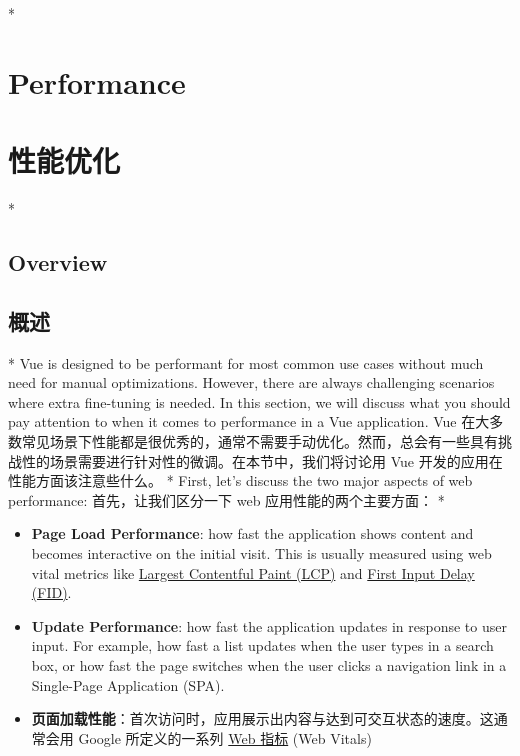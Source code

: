 \begin{paracol}{2} 
\switchcolumn[0]*%
\section{Performance}
\switchcolumn
\section{性能优化}
\switchcolumn[0]*%
\subsection{Overview}
\switchcolumn
\subsection{概述}
\switchcolumn[0]*%
Vue is designed to be performant for most common use cases without much
need for manual optimizations. However, there are always challenging
scenarios where extra fine-tuning is needed. In this section, we will
discuss what you should pay attention to when it comes to performance in
a Vue application.
\switchcolumn
Vue
在大多数常见场景下性能都是很优秀的，通常不需要手动优化。然而，总会有一些具有挑战性的场景需要进行针对性的微调。在本节中，我们将讨论用
Vue 开发的应用在性能方面该注意些什么。
\switchcolumn[0]*%
First, let's discuss the two major aspects of web performance:
\switchcolumn
首先，让我们区分一下 web 应用性能的两个主要方面： 
\switchcolumn[0]*%
\begin{itemize}
\item
  \textbf{Page Load Performance}: how fast the application shows content
  and becomes interactive on the initial visit. This is usually measured
  using web vital metrics like \href{https://web.dev/lcp/}{Largest
  Contentful Paint (LCP)} and \href{https://web.dev/fid/}{First Input
  Delay (FID)}.
\item
  \textbf{Update Performance}: how fast the application updates in
  response to user input. For example, how fast a list updates when the
  user types in a search box, or how fast the page switches when the
  user clicks a navigation link in a Single-Page Application (SPA).
\end{itemize}
\switchcolumn
\begin{itemize}
\item
  \textbf{页面加载性能}：首次访问时，应用展示出内容与达到可交互状态的速度。这通常会用
  Google 所定义的一系列
  \href{https://web.dev/vitals/\#core-web-vitals}{Web 指标} (Web Vitals)

\end{itemize}
\end{paracol}
